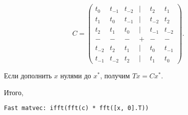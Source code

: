 \[
    C = \begin{pmatrix}
        t_0 & t_{-1} & t_{-2} & | & t_2 & t_1 \\
        t_1 & t_0 & t_{-1} & | & t_{-2} & t_2 \\
        t_2 & t_1 & t_0 & | & t_{-1} & t_{-2} \\
        - & - & - & + & - & - \\
        t_{-2} & t_2 & t_1 & | & t_0 & t_{-1} \\
        t_{-1} & t_{-2} & t_2 & | & t_1 & t_0
    \end{pmatrix}.
\]

Если дополнить $x$ нулями до $x^*$, получим $T x = C x^*$.

Итого,

\verb|Fast matvec: ifft(fft(c) * fft([x, 0].T))|
